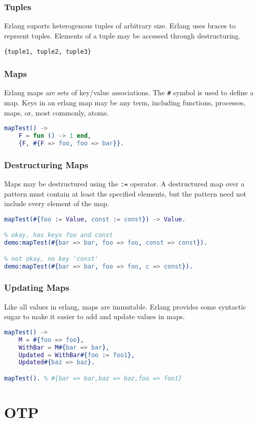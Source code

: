 \documentclass{beamer}
\begin{document}
\begin{frame}[fragile]
  \frametitle{Tuples}
  Erlang suports heterogenous tuples of arbitrary size.  Erlang uses
  braces to reprsent tuples.  Elements of a tuple may be accessed
  through destructuring.

  \verb!{tuple1, tuple2, tuple3}!
\end{frame}

\begin{frame}[fragile]
  \frametitle{Maps}
  Erlang maps are sets of key/value associations.  The \verb!#! symbol
  is used to define a map.  Keys in an erlang map may be any term,
  including functions, processes, maps, or, most commonly, atoms.

\begin{lstlisting}[language=erlang]
mapTest() ->
    F = fun () -> 1 end,
    {F, #{F => foo, foo => bar}}.
\end{lstlisting}
\end{frame}

\begin{frame}[fragile]
  \frametitle{Destructuring Maps}
  Maps may be destructured using the \verb!:=! operator.  A
  destructured map over a pattern must contain at least the specified
  elements, but the pattern need not include every element of the map.

\begin{lstlisting}[language=erlang]
mapTest(#{foo := Value, const := const}) -> Value.

% okay, has keys foo and const
demo:mapTest(#{bar => bar, foo => foo, const => const}).

% not okay, no key 'const'
demo:mapTest(#{bar => bar, foo => foo, c => const}).
\end{lstlisting}
\end{frame}

\begin{frame}[fragile]
  \frametitle{Updating Maps}
  Like all values in erlang, maps are immutable.  Erlang provides some
  syntactic sugar to make it easier to add and update values in maps.
\begin{lstlisting}[language=erlang]
mapTest() ->
    M = #{foo => foo},
    WithBar = M#{bar => bar},
    Updated = WithBar#{foo := foo1},
    Updated#{baz => baz}.

mapTest(). % #{bar => bar,baz => baz,foo => foo1}
\end{lstlisting}
\end{frame}

\section{OTP}
\end{document}
